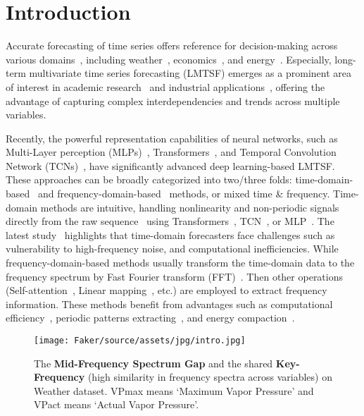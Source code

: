 \section{Introduction}

Accurate forecasting of time series offers reference for decision-making across various domains~\citep{Lim2021tsfsurvey,torres2021tsfsurvey}, including weather~\citep{du2022preformer}, economics~\citep{Oreshkin2020nbeats}, and energy~\citep{dong2023simmtm,Liu2021pyraformer}. Especially, long-term multivariate time series forecasting (LMTSF) emerges as a prominent area of interest in academic research~\citep{Wangtslb2024,wen2022transformersurvey} and industrial applications~\citep{cirstea2022triformer}, offering the advantage of capturing complex interdependencies and trends across multiple variables. 

Recently, the powerful representation capabilities of neural networks, such as Multi-Layer perception (MLPs)~\citep{yi2023fremlp,han2024softs}, Transformers~\citep{zhou2022fedformer,Nie2022patchtst}, and Temporal Convolution Network (TCNs)~\citep{tslanet,Liu2021scinet}, have significantly advanced deep learning-based LMTSF. These approaches can be broadly categorized into two/three folds: time-domain-based~\citep{han2024softs,Nie2022patchtst,Liu2021scinet} and frequency-domain-based~\citep{yi2023fremlp,zhou2022fedformer,tslanet} methods, or mixed time \& frequency. Time-domain methods are intuitive, handling nonlinearity and non-periodic signals directly from the raw sequence~\citep{Li2023rlinear} using Transformers~\citep{Zhou2020informer}, TCN~\citep{donghao2024moderntcn}, or MLP~\citep{wang2023timemixer}.
The latest study~\cite {yi2024filternet} highlights that time-domain forecasters face challenges such as vulnerability to high-frequency noise, and computational inefficiencies.
While frequency-domain-based methods usually transform the time-domain data to the frequency spectrum by Fast Fourier transform (FFT)~\citep{yi2023freqsurvey}. Then other operations (Self-attention~\citep{zhou2022fedformer}, Linear mapping~\citep{xu2024fits,yi2023fremlp}, etc.) are employed to extract frequency information.
These methods benefit from advantages such as computational efficiency~\citep{fan2024efficiency,xu2024fits}, periodic patterns extracting~\citep{wu2022timesnet,dai2024pdf}, and energy compaction~\citep{yi2023fremlp,yi2023fouriergnn}. 

\begin{figure*}[!h]
  \centering
  \texttt{[image: Faker/source/assets/jpg/intro.jpg]}
  \caption{\small{The \textbf{Mid-Frequency Spectrum Gap} and the shared \textbf{Key-Frequency} (high similarity in frequency spectra across variables) on Weather dataset. VPmax means `Maximum Vapor Pressure' and VPact means `Actual Vapor Pressure'.}}
  \label{fig:intro}
\end{figure*}

